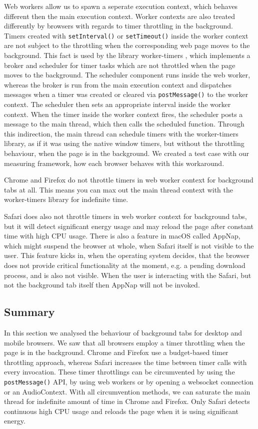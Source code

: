 \documentclass[article,type=bsc,colorback,accentcolor=tud9c]{tudthesis}
\begin{document}
  Web workers allow us to spawn a seperate execution context, which behaves different then the main execution context. Worker contexts are also treated differently by browsers with regards to timer throttling in the background. Timers created with \texttt{setInterval()} or \texttt{setTimeout()} inside the worker context are not subject to the throttling when the corresponding web page moves to the background. This fact is used by the library worker-timers \cite{worker-timers}, which implements a broker and scheduler for timer tasks which are not throttled when the page moves to the background. The scheduler component runs inside the web worker, whereas the broker is run from the main execution context and dispatches messages when a timer was created or cleared via \texttt{postMessage()} to the worker context. The scheduler then sets an appropriate interval inside the worker context. When the timer inside the worker context fires, the scheduler posts a message to the main thread, which then calls the scheduled function. Through this indirection, the main thread can schedule timers with the worker-timers library, as if it was using the native window timers, but without the throttling behaviour, when the page is in the background. We created a test case with our measuring framework, how each browser behaves with this workaround.
  
  Chrome and Firefox do not throttle timers in web worker context for background tabs at all. This means you can max out the main thread context with the worker-timers library for indefinite time.

  Safari does also not throttle timers in web worker context for background tabs, but it will detect significant energy usage and may reload the page after constant time with high CPU usage. There is also a feature in macOS called AppNap, which might suspend the browser at whole, when Safari itself is not visible to the user. This feature kicks in, when the operating system decides, that the browser does not provide critical functionality at the moment, e.g. a pending download process,  and is also not visible. When the user is interacting with the Safari, but not the background tab itself then AppNap will not be invoked.
  

  \subsection{Summary}

  In this section we analysed the behaviour of background tabs for desktop and mobile browsers. We saw that all browsers employ a timer throttling when the page is in the background. Chrome and Firefox use a budget-based timer throttling approach, whereas Safari increases the time between timer calls with every invocation. These timer throttlings can be circumvented by using the \texttt{postMessage()} API, by using web workers or by opening a websocket connection or an AudioContext. With all circumvention methods, we can saturate the main thread for indefinite amount of time in Chrome and Firefox. Only Safari detects continuous high CPU usage and reloads the page when it is using significant energy.
\end{document}
